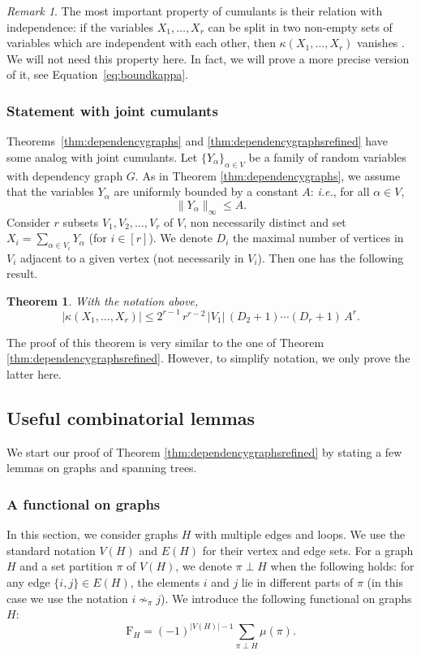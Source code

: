 \documentclass[12pt,a4paper,reqno]{amsart}
\newtheorem{theorem}[lemma]{Theorem}
\theoremstyle{remark}
\newtheorem{remark}[lemma]{Remark}
\newcommand{\SF}{\mathrm{F}}
\begin{document}
\begin{remark}
    The most important property of cumulants is their relation with independence: if the variables $X_1,\dots,X_r$ can be split in two non-empty sets of variables which are independent with each other, then $\kappa (X_1,\dots,X_r)$ vanishes \cite[Proposition 6.16 (v)]{JLR00}. We will not need this property here. In fact, we will prove a more precise version of it, see Equation~\eqref{eq:boundkappa}.
\end{remark}\medskip


\subsubsection{Statement with joint cumulants}
Theorems~\ref{thm:dependencygraphs} and \ref{thm:dependencygraphsrefined} have some analog with joint cumulants. Let $\{Y_\alpha\}_{\alpha \in V}$ be a family of random variables with dependency graph $G$. As in Theorem \ref{thm:dependencygraphs}, we assume that the variables $Y_\alpha$ are uniformly bounded by a constant $A$: {\em i.e.}, for all $\alpha \in V$, 
$$ \|Y_\alpha\|_\infty \leq A.$$
Consider $r$ subsets $V_1, V_2,\ldots, V_r$ of $V$, non necessarily distinct and set $X_i=\sum_{\alpha \in V_i} Y_{\alpha}$ (for $i \in [r]$). We denote $D_i$ the maximal number of vertices in $V_i$ adjacent to a given vertex (not necessarily in $V_i$). Then one has the following result.

\begin{theorem} \label{thm:boundjointcumulant}
With the notation above,
$$ |\kappa(X_1,\dots,X_r)| \le 2^{r-1}\, r^{r-2} \,|V_1|\,(D_2 +1) \cdots (D_r +1)\, A^r .$$
\end{theorem}

\noindent The proof of this theorem is very similar to the one of Theorem \ref{thm:dependencygraphsrefined}.
However, to simplify notation, we only prove the latter here.\bigskip



\subsection{Useful combinatorial lemmas}
We start our proof of Theorem \ref{thm:dependencygraphsrefined} by stating a few lemmas on graphs and spanning trees.

\subsubsection{A functional on graphs}
In this section, we consider graphs $H$ with multiple edges and loops. We use the standard notation $V(H)$ and $E(H)$ for their vertex and edge sets. For a graph $H$ and a set partition $\pi$ of $V(H)$, we denote $\pi \perp H$ when the following holds: for any edge $\{i,j\} \in E(H)$, the elements $i$ and $j$ lie in different parts of $\pi$ (in this case we use the notation $i \nsim_\pi j$). We introduce the following functional on graphs $H$:
$$\SF_{H}=(-1)^{|V(H)|-1}\sum_{\pi \perp H}\mu(\pi).$$
\end{document}
